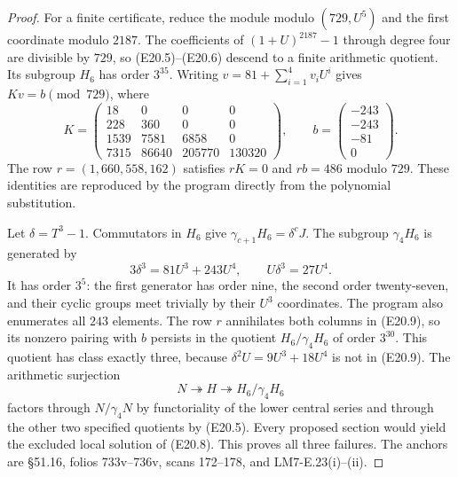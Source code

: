 \begin{proof}
For a finite certificate, reduce the module
modulo $(729,U^5)$ and the first coordinate
modulo $2187$. The coefficients of
$(1+U)^{2187}-1$ through degree four are
divisible by $729$, so (E20.5)--(E20.6)
descend to a finite arithmetic quotient.
Its subgroup $H_6$ has order $3^{35}$.
Writing $v=81+\sum_{i=1}^4v_iU^i$ gives
$Kv=b\pmod{729}$, where
\[
 K=\begin{pmatrix}
 18&0&0&0\\228&360&0&0\\
 1539&7581&6858&0\\7315&86640&205770&130320
 \end{pmatrix},\qquad
 b=\begin{pmatrix}-243\\-243\\-81\\0\end{pmatrix}.
 \tag{E20.8}
\]
The row $r=(1,660,558,162)$ satisfies
$rK=0$ and $rb=486$ modulo $729$.
These identities are reproduced by the program
directly from the polynomial substitution.

Let $\delta=T^3-1$. Commutators in $H_6$ give
$\gamma_{c+1}H_6=\delta^cJ$. The subgroup
$\gamma_4H_6$ is generated by
\[
       3\delta^3=81U^3+243U^4,
               \qquad U\delta^3=27U^4.
 \tag{E20.9}
\]
It has order $3^5$: the first generator has
order nine, the second order twenty-seven,
and their cyclic groups meet trivially by
their $U^3$ coordinates. The program also
enumerates all $243$ elements. The row $r$
annihilates both columns in (E20.9), so its
nonzero pairing with $b$ persists in the
quotient $H_6/\gamma_4H_6$ of order $3^{30}$.
This quotient has class exactly three,
because $\delta^2U=9U^3+18U^4$ is not in
(E20.9). The arithmetic surjection
\[
             N\twoheadrightarrow H
                 \twoheadrightarrow H_6/\gamma_4H_6
 \tag{E20.10}
\]
factors through $N/\gamma_4N$ by functoriality
of the lower central series and through the
other two specified quotients by (E20.5).
Every proposed section would yield the
excluded local solution of (E20.8).
This proves all three failures. The anchors
are \S51.16, folios 733v--736v, scans
172--178, and LM7-E.23(i)--(ii).
\end{proof}

